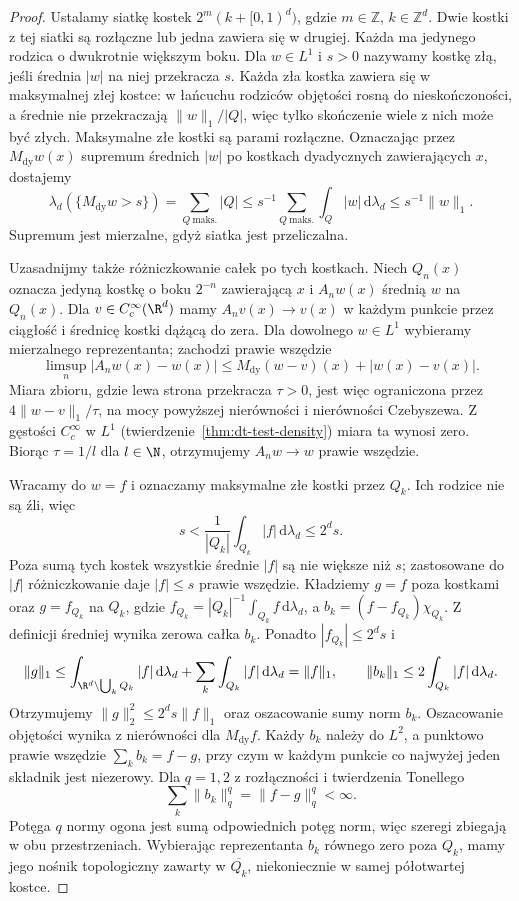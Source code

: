 \begin{proof}
Ustalamy siatkę kostek $2^m(k+[0,1)^d)$,
gdzie $m\in\mathbb Z$, $k\in\mathbb Z^d$.
Dwie kostki z tej siatki są rozłączne lub jedna
zawiera się w drugiej. Każda ma jedynego rodzica
o dwukrotnie większym boku. Dla $w\in L^1$
i $s>0$ nazywamy kostkę złą, jeśli średnia $|w|$
na niej przekracza $s$. Każda zła kostka zawiera
się w maksymalnej złej kostce: w łańcuchu rodziców
objętości rosną do nieskończoności, a średnie
nie przekraczają $\|w\|_1/|Q|$, więc tylko skończenie
wiele z nich może być złych. Maksymalne złe kostki
są parami rozłączne. Oznaczając przez $M_{\mathrm{dy}}w(x)$
supremum średnich $|w|$ po kostkach dyadycznych
zawierających $x$, dostajemy
\[
 \lambda_d(\{M_{\mathrm{dy}}w>s\})
 =\sum_{Q\ \mathrm{maks.}}|Q|
 \le s^{-1}\sum_{Q\ \mathrm{maks.}}\int_Q|w|\,\mathrm d\lambda_d
 \le s^{-1}\|w\|_1.
\]
Supremum jest mierzalne, gdyż siatka jest przeliczalna.

Uzasadnijmy także różniczkowanie całek po tych kostkach.
Niech $Q_n(x)$ oznacza jedyną kostkę o boku $2^{-n}$
zawierającą $x$ i $A_n w(x)$ średnią $w$ na $Q_n(x)$.
Dla $v\in C_c^\infty(\R^d)$ mamy $A_nv(x)\to v(x)$
w każdym punkcie przez ciągłość i średnicę kostki dążącą
do zera. Dla dowolnego $w\in L^1$ wybieramy
mierzalnego reprezentanta; zachodzi prawie wszędzie
\[
 \limsup_n |A_nw(x)-w(x)|
 \le M_{\mathrm{dy}}(w-v)(x)+|w(x)-v(x)|.
\]
Miara zbioru, gdzie lewa strona przekracza $\tau>0$,
jest więc ograniczona przez $4\|w-v\|_1/\tau$,
na mocy powyższej nierówności i nierówności Czebyszewa.
Z gęstości $C_c^\infty$ w $L^1$
(twierdzenie~\ref{thm:dt-test-density}) miara ta wynosi zero.
Biorąc $\tau=1/l$ dla $l\in\N$, otrzymujemy
$A_nw\to w$ prawie wszędzie.

Wracamy do $w=f$ i oznaczamy maksymalne złe kostki
przez $Q_k$. Ich rodzice nie są źli, więc
\[
 s<\frac1{|Q_k|}\int_{Q_k}|f|\,\mathrm d\lambda_d
 \le 2^ds.
\]
Poza sumą tych kostek wszystkie średnie $|f|$ są
nie większe niż $s$; zastosowane do $|f|$ różniczkowanie
daje $|f|\le s$ prawie wszędzie. Kładziemy
$g=f$ poza kostkami oraz $g=f_{Q_k}$ na $Q_k$, gdzie
$f_{Q_k}=|Q_k|^{-1}\int_{Q_k}f\,\mathrm d\lambda_d$,
a $b_k=(f-f_{Q_k})\chi_{Q_k}$.
Z definicji średniej wynika zerowa całka $b_k$.
Ponadto $|f_{Q_k}|\le 2^ds$ i
\[
 \|g\|_1
 \le\int_{\R^d\setminus\bigcup_k Q_k}|f|\,\mathrm d\lambda_d
    +\sum_k\int_{Q_k}|f|\,\mathrm d\lambda_d
 =\|f\|_1,\qquad
 \|b_k\|_1\le2\int_{Q_k}|f|\,\mathrm d\lambda_d.
\]
Otrzymujemy $\|g\|_2^2\le2^ds\|f\|_1$ oraz
oszacowanie sumy norm $b_k$. Oszacowanie objętości
wynika z nierówności dla $M_{\mathrm{dy}}f$.
Każdy $b_k$ należy do $L^2$, a punktowo prawie wszędzie
$\sum_k b_k=f-g$, przy czym w każdym punkcie co najwyżej
jeden składnik jest niezerowy.
Dla $q=1,2$ z rozłączności i twierdzenia Tonellego
\[
 \sum_k\|b_k\|_q^q=\|f-g\|_q^q<\infty .
\]
Potęga $q$ normy ogona jest sumą odpowiednich potęg
norm, więc szeregi zbiegają w obu przestrzeniach.
Wybierając reprezentanta $b_k$ równego zero poza $Q_k$,
mamy jego nośnik topologiczny zawarty w $\overline{Q_k}$,
niekoniecznie w samej półotwartej kostce.
\end{proof}

